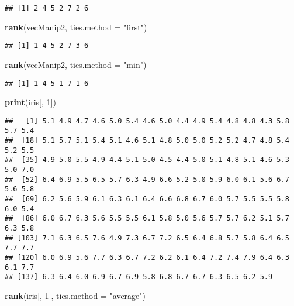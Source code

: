 \documentclass[]{book}
\newenvironment{Shaded}{\begin{snugshade}}{\end{snugshade}}
\newcommand{\KeywordTok}[1]{\textcolor[rgb]{0.13,0.29,0.53}{\textbf{#1}}}
\newcommand{\DataTypeTok}[1]{\textcolor[rgb]{0.13,0.29,0.53}{#1}}
\newcommand{\DecValTok}[1]{\textcolor[rgb]{0.00,0.00,0.81}{#1}}
\newcommand{\StringTok}[1]{\textcolor[rgb]{0.31,0.60,0.02}{#1}}
\newcommand{\NormalTok}[1]{#1}
\theoremstyle{definition}
\theoremstyle{definition}
\theoremstyle{definition}
\theoremstyle{remark}
\begin{document}
\begin{verbatim}
## [1] 2 4 5 2 7 2 6
\end{verbatim}

\begin{Shaded}
\begin{Highlighting}[]
\KeywordTok{rank}\NormalTok{(vecManip2, }\DataTypeTok{ties.method =} \StringTok{"first"}\NormalTok{)}
\end{Highlighting}
\end{Shaded}

\begin{verbatim}
## [1] 1 4 5 2 7 3 6
\end{verbatim}

\begin{Shaded}
\begin{Highlighting}[]
\KeywordTok{rank}\NormalTok{(vecManip2, }\DataTypeTok{ties.method =} \StringTok{"min"}\NormalTok{)}
\end{Highlighting}
\end{Shaded}

\begin{verbatim}
## [1] 1 4 5 1 7 1 6
\end{verbatim}

\begin{Shaded}
\begin{Highlighting}[]
\KeywordTok{print}\NormalTok{(iris[, }\DecValTok{1}\NormalTok{])}
\end{Highlighting}
\end{Shaded}

\begin{verbatim}
##   [1] 5.1 4.9 4.7 4.6 5.0 5.4 4.6 5.0 4.4 4.9 5.4 4.8 4.8 4.3 5.8 5.7 5.4
##  [18] 5.1 5.7 5.1 5.4 5.1 4.6 5.1 4.8 5.0 5.0 5.2 5.2 4.7 4.8 5.4 5.2 5.5
##  [35] 4.9 5.0 5.5 4.9 4.4 5.1 5.0 4.5 4.4 5.0 5.1 4.8 5.1 4.6 5.3 5.0 7.0
##  [52] 6.4 6.9 5.5 6.5 5.7 6.3 4.9 6.6 5.2 5.0 5.9 6.0 6.1 5.6 6.7 5.6 5.8
##  [69] 6.2 5.6 5.9 6.1 6.3 6.1 6.4 6.6 6.8 6.7 6.0 5.7 5.5 5.5 5.8 6.0 5.4
##  [86] 6.0 6.7 6.3 5.6 5.5 5.5 6.1 5.8 5.0 5.6 5.7 5.7 6.2 5.1 5.7 6.3 5.8
## [103] 7.1 6.3 6.5 7.6 4.9 7.3 6.7 7.2 6.5 6.4 6.8 5.7 5.8 6.4 6.5 7.7 7.7
## [120] 6.0 6.9 5.6 7.7 6.3 6.7 7.2 6.2 6.1 6.4 7.2 7.4 7.9 6.4 6.3 6.1 7.7
## [137] 6.3 6.4 6.0 6.9 6.7 6.9 5.8 6.8 6.7 6.7 6.3 6.5 6.2 5.9
\end{verbatim}

\begin{Shaded}
\begin{Highlighting}[]
\KeywordTok{rank}\NormalTok{(iris[, }\DecValTok{1}\NormalTok{], }\DataTypeTok{ties.method =} \StringTok{"average"}\NormalTok{)}
\end{Highlighting}
\end{Shaded}
\end{document}
